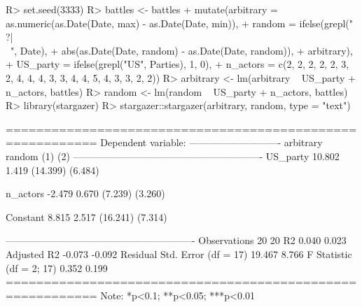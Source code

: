 \documentclass[
]{jss}
\begin{document}
\begin{CodeChunk}
\begin{CodeInput}
R> set.seed(3333)
R> battles <- battles %
+   mutate(arbitrary = as.numeric(as.Date(Date, max) - as.Date(Date, min)),
+          random = ifelse(grepl("\\?|\\~", Date),
+                          abs(as.Date(Date, random) - as.Date(Date, random)),
+                          arbitrary),
+          US_party = ifelse(grepl("US", Parties), 1, 0),
+          n_actors = c(2, 2, 2, 2, 2, 3, 2, 4, 4, 4, 3, 3, 4, 4, 5, 4, 3, 3, 2, 2))
R> arbitrary <- lm(arbitrary ~ US_party + n_actors, battles)
R> random <- lm(random ~ US_party + n_actors, battles)
R> library(stargazer)
R> stargazer::stargazer(arbitrary, random, type = "text")
\end{CodeInput}
\begin{CodeOutput}

==========================================================
                                  Dependent variable:     
                              ----------------------------
                                 arbitrary       random   
                                    (1)           (2)     
----------------------------------------------------------
US_party                          10.802         1.419    
                                 (14.399)       (6.484)   
                                                          
n_actors                          -2.479         0.670    
                                  (7.239)       (3.260)   
                                                          
Constant                           8.815         2.517    
                                 (16.241)       (7.314)   
                                                          
----------------------------------------------------------
Observations                        20             20     
R2                                 0.040         0.023    
Adjusted R2                       -0.073         -0.092   
Residual Std. Error (df = 17)     19.467         8.766    
F Statistic (df = 2; 17)           0.352         0.199    
==========================================================
Note:                          *p<0.1; **p<0.05; ***p<0.01
\end{CodeOutput}
\end{CodeChunk}
\end{document}
